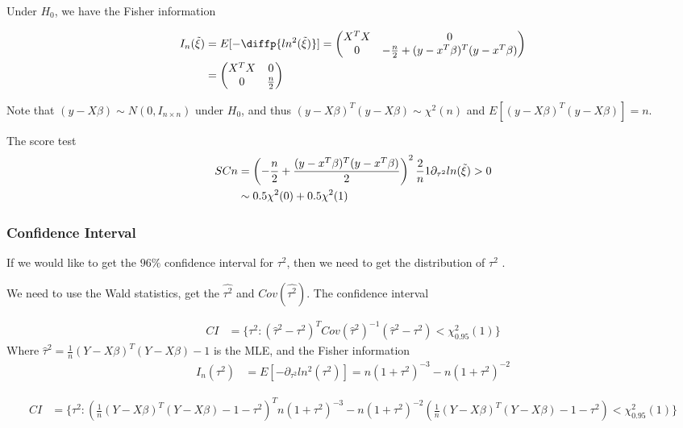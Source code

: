 \documentclass[11pt]{article} %
\begin{document}
Under $H_0$, we have the Fisher information

\begin{align*}
	I_n(\Tilde{\xi}) &= E[-\diffp{ln^2(\Tilde{\xi})}] = \begin{pmatrix*}
		 X^T X  &  0\\
		0 & -\frac{n}{2} + {(y-x^T \beta)^T (y-x^T \beta)} 
	\end{pmatrix*}\\
& = \begin{pmatrix*}
	X^T X  &  0\\
	0 & \frac{n}{2} 
\end{pmatrix*}
\end{align*}

Note that $(y-X \beta) \sim N(0, I_{n \times n})$ under $H_0$, and thus $(y-X \beta)^T (y-X \beta) \sim \chi^2(n)$ and $E[(y-X \beta)^T (y-X \beta)] = n$.

The score test
\begin{align*}
	SCn & = \left(-\frac{n}{2}  + \frac{ (y-x^T \beta)^T (y-x^T \beta)}{2 }\right)^2  \frac{2}{n} 1{\partial_{\tau^2} ln(\Tilde{\xi}) > 0} \\
	& \sim 0.5 \chi^2(0) + 0.5 \chi^2(1)
\end{align*}

\subsubsection{Confidence Interval}
If we would like to get the $96 \%$ confidence interval for $\tau^2$, then we need to get the distribution of $\tau^2$ .

We need to use the Wald statistics, get the $\hat{\tau^2}$ and $Cov(\hat{\tau^2})$. The confidence interval

\begin{align*}
	CI & = \{ \tau^2 : (\hat{\tau}^2 - \tau^2)^T Cov(\hat{\tau}^2)^{-1} (\hat{\tau}^2 - \tau^2) < \chi^2_{0.95}(1)\}
\end{align*}
Where $\hat{\tau}^2 = \frac{1}{n} (Y- X\beta)^T (Y- X\beta) - 1$ is the MLE, and the Fisher information
\begin{align*}
	I_n(\tau^2) & = E[- \partial_{\tau^2}ln^2(\tau^2)] = n (1+\tau^2)^{-3} - n (1+\tau^2)^{-2}
\end{align*}

\begin{align*}
	CI & = \{ \tau^2 : (\frac{1}{n} (Y- X\beta)^T (Y- X\beta) - 1 - \tau^2)^T n (1+\tau^2)^{-3} - n (1+\tau^2)^{-2} (\frac{1}{n} (Y- X\beta)^T (Y- X\beta) - 1 - \tau^2) < \chi^2_{0.95}(1)\}
\end{align*}
\end{document}
